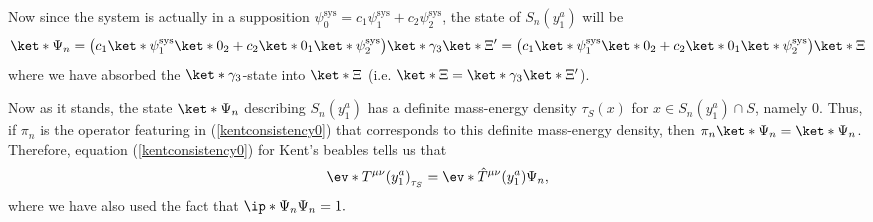 \documentclass[12pt]{report}
\begin{document}
 Now since the system is actually in a supposition $\psi_0^\text{sys} = c_1\psi_1^\text{sys}+c_2\psi_2^\text{sys}$, the state of $S_n(y^a_1)$ will be 
 \begin{equation*}
 \ket*{\Psi_n}=\big(c_1\ket*{\psi_1^\text{sys}}\ket*{0_2}+c_2\ket*{0_1}\ket*{\psi_2^\text{sys}}\big)\ket*{\gamma_3}\ket*{\Xi'}=\big(c_1\ket*{\psi_1^\text{sys}}\ket*{0_2}+c_2\ket*{0_1}\ket*{\psi_2^\text{sys}}\big)\ket*{\Xi}
 \end{equation*}
where we have absorbed the $\ket*{\gamma_3}$-state into $\ket*{\Xi}$ (i.e. $\ket*{\Xi}= \ket*{\gamma_3}\ket*{\Xi'}$).

Now as it stands, the state $\ket*{\Psi_n}$ describing $S_n(y^a_1)$ has a definite mass-energy density $\tau_S(x)$ for $x\in S_n(y^a_1)\cap S$, namely $0$. Thus, if $\pi_n$ is the operator featuring in (\ref{kentconsistency0}) that corresponds to this definite mass-energy density, then $\pi_n\ket*{\Psi_n}=\ket*{\Psi_n}$. Therefore, equation (\ref{kentconsistency0}) for Kent's beables tells us that
\begin{equation}\label{kentbeablenoinfo}
\ev*{T^{\mu\nu}(y^a_1)}_{\tau_S}=\ev*{\hat{T}^{\mu\nu}(y^a_1)}{\Psi_n},
\end{equation}
where we have also used the fact that $\ip*{\Psi_n}{\Psi_n}=1.$
\end{document}
